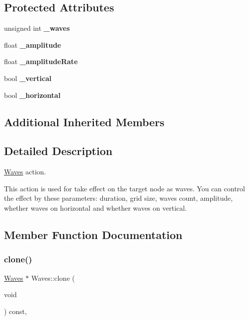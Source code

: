\subsection*{Protected Attributes}
\begin{DoxyCompactItemize}
\item 
\mbox{\label{classWaves_ae049cdc4a0e6db5061a1fb7611d7d348}} 
unsigned int {\bfseries \+\_\+waves}
\item 
\mbox{\label{classWaves_ae8aef797dee6a21bc179658ea5255557}} 
float {\bfseries \+\_\+amplitude}
\item 
\mbox{\label{classWaves_a13fa05fd1ee6aed20043d160de9c6a34}} 
float {\bfseries \+\_\+amplitude\+Rate}
\item 
\mbox{\label{classWaves_aca4b7ef36534baeb3ab4643fd0cd9bc5}} 
bool {\bfseries \+\_\+vertical}
\item 
\mbox{\label{classWaves_a8829724971c8a70c67073c062b702f42}} 
bool {\bfseries \+\_\+horizontal}
\end{DoxyCompactItemize}
\subsection*{Additional Inherited Members}


\subsection{Detailed Description}
\hyperlink{classWaves}{Waves} action. 

This action is used for take effect on the target node as waves. You can control the effect by these parameters\+: duration, grid size, waves count, amplitude, whether waves on horizontal and whether waves on vertical. 

\subsection{Member Function Documentation}
\mbox{\label{classWaves_a4d92fc4a2d0d52f24310b4b9df4ae547}} 
\subsubsection{\texorpdfstring{clone()}{clone()}\hspace{0.1cm}{\footnotesize\ttfamily [1/2]}}
{\footnotesize\ttfamily \hyperlink{classWaves}{Waves} $\ast$ Waves\+::clone (\begin{DoxyParamCaption}\item[{void}]{ }\end{DoxyParamCaption}) const\hspace{0.3cm}{\ttfamily [override]}, {\ttfamily [virtual]}}

